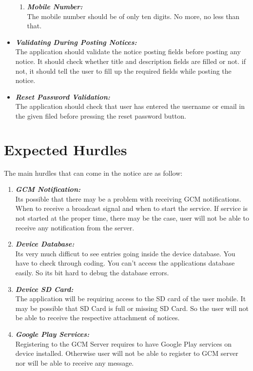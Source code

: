 \begin{itemize}
\begin{enumerate}
\item \textbf{\emph{Mobile Number:}}\\
The mobile number should be of only ten digits. No more, no less than that.
\end{enumerate}

\item \textbf{\emph{Validating During Posting Notices:}}\\
The application should validate the notice posting fields before posting any notice. It should check whether title and description fields are filled or not. if not, it should tell the user to fill up the required fields while posting the notice.

\item \textbf{\emph{Reset Password Validation:}}\\
The application should check that user has entered the username or email in the given filed before pressing the reset password button.

\end{itemize}

\pagebreak
\section{Expected Hurdles}
The main hurdles that can come in the notice are as follow:
\begin{enumerate}
\item \textbf{\emph{GCM Notification:}}\\
Its possible that there may be a problem with receiving GCM notifications. When to receive a broadcast signal and when to start the service.
If service is not started at the proper time, there may be the case, user will not be able to receive any notification from the server.

\item \textbf{\emph{Device Database:}}\\
Its very much difficut to see entries going inside the device database. You have to check through coding. You can't access the applications database easily. So its bit hard to debug the database errors.

\item \textbf{\emph{Device SD Card:}}\\
The application will be requiring access to the SD card of the user mobile. It may be possible that SD Card is full or missing SD Card. So the user will not be able to receive the respective attachment of notices.

\item \textbf{\emph{Google Play Services:}}\\
Registering to the GCM Server requires to have Google Play services on device installed. Otherwise user will not be able to register 
to GCM server nor will be able to receive any message.
\end{enumerate}

